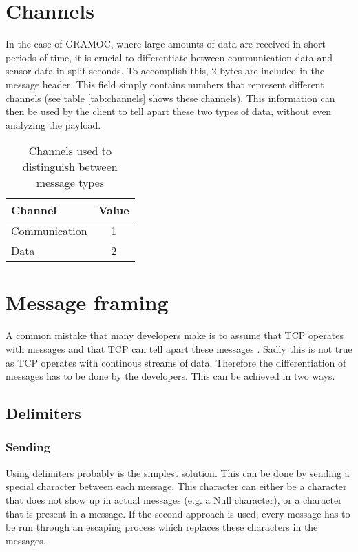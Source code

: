 \section{Channels}
\label{sec:channels}

In the case of GRAMOC, where large amounts of data are received in short periods of time, it is crucial to differentiate between communication data and sensor data in split seconds. To accomplish this, 2 bytes are included in the message header. This field simply contains numbers that represent different channels (see table \vref{tab:channels} shows these channels). This information can then be used by the client to tell apart these two types of data, without even analyzing the payload.

\begin{table}[h]
    \centering
    \begin{tabular}{| l | c |}
    \hline
    \textbf{Channel} & \textbf{Value} \\ \hline
    Communication & 1 \\ \hline
    Data & 2 \\
    \hline
    \end{tabular}
    \caption{Channels used to distinguish between message types}
    \label{tab:channels}
\end{table}

\section{Message framing}
\label{sec:messageframing}

A common mistake that many developers make is to assume that TCP operates with messages and that TCP can tell apart these messages \autocite{MessageFramingCleary} \autocite{MessageFramingSkotzko}. Sadly this is not true as TCP operates with continous streams of data. Therefore the differentiation of messages has to be done by the developers. This can be achieved in two ways.

\subsection{Delimiters}

\subsubsection{Sending}

Using delimiters probably is the simplest solution. This can be done by sending a special character between each message. This character can either be a character that does not show up in actual messages (e.g. a Null character), or a character that is present in a message. If the second approach is used, every message has to be run through an escaping process which replaces these characters in the messages.

